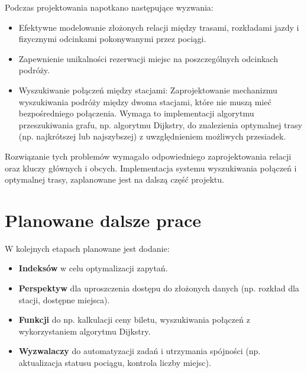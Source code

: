 \documentclass[11pt, a4paper]{article}
\begin{document}
Podczas projektowania napotkano następujące wyzwania:
\begin{itemize}
	\item Efektywne modelowanie złożonych relacji między trasami, rozkładami jazdy i fizycznymi odcinkami pokonywanymi przez pociągi.
	\item Zapewnienie unikalności rezerwacji miejsc na poszczególnych odcinkach podróży.
	\item Wyszukiwanie połączeń między stacjami: Zaprojektowanie mechanizmu wyszukiwania podróży między dwoma stacjami, które nie muszą mieć bezpośredniego połączenia. Wymaga to implementacji algorytmu przeszukiwania grafu, np. algorytmu Dijkstry, do znalezienia optymalnej trasy (np. najkrótszej lub najszybszej) z uwzględnieniem możliwych przesiadek.
\end{itemize}
Rozwiązanie tych problemów wymagało odpowiedniego zaprojektowania relacji oraz kluczy głównych i obcych.
Implementacja systemu wyszukiwania połączeń i optymalnej trasy, zaplanowane jest na dalszą część projektu.

\section{Planowane dalsze prace}

W kolejnych etapach planowane jest dodanie:
\begin{itemize}
	\item \textbf{Indeksów} w celu optymalizacji zapytań.
	\item \textbf{Perspektyw} dla uproszczenia dostępu do złożonych danych (np. rozkład dla stacji, dostępne miejsca).
	\item \textbf{Funkcji} do np. kalkulacji ceny biletu, wyszukiwania połączeń z wykorzystaniem algorytmu Dijkstry.
	\item \textbf{Wyzwalaczy} do automatyzacji zadań i utrzymania spójności (np. aktualizacja statusu pociągu, kontrola liczby miejsc).
\end{itemize}
\end{document}
